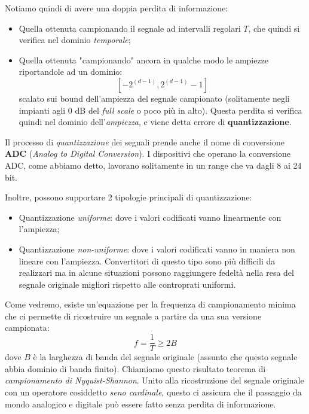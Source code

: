\documentclass[a4paper,11pt]{article}
\begin{document}
\begin{enumerate}
		Notiamo quindi di avere una doppia perdita di informazione:
		\begin{itemize}
			\item Quella ottenuta campionando il segnale ad intervalli regolari $T$, che quindi si verifica nel dominio \textit{temporale};
			\item Quella ottenuta "campionando" ancora in qualche modo le ampiezze riportandole ad un dominio:
				$$
					[-2^{(d - 1)}, 2^{(d - 1)} - 1]
				$$
				scalato sui bound dell'ampiezza del segnale campionato (solitamente negli impianti agli 0 dB del \textit{full scale} o poco più in alto). 
				Questa perdita si verifica quindi nel dominio dell'\textit{ampiezza}, e viene detta errore di \textbf{quantizzazione}.
		\end{itemize}

		Il processo di \textit{quantizzazione} dei segnali prende anche il nome di conversione \textbf{ADC} (\textit{Analog to Digital Conversion}). I dispositivi che operano la conversione ADC, come abbiamo detto, lavorano solitamente in un range che va dagli 8 ai 24 bit.
	
		\newpage

		Inoltre, possono supportare 2 tipologie principali di quantizzazione:
		\begin{itemize}
			\item Quantizzazione \textit{uniforme}: dove i valori codificati vanno linearmente con l'ampiezza; 
			\item Quantizzazione \textit{non-uniforme}: dove i valori codificati vanno in maniera non lineare con l'ampiezza. Convertitori di questo tipo sono più difficili da realizzari ma in alcune situazioni possono raggiungere fedeltà nella resa del segnale originale migliori rispetto alle controprati uniformi.
		\end{itemize}
\end{enumerate}

Come vedremo, esiste un'equazione per la frequenza di campionamento minima che ci permette di ricostruire un segnale a partire da una sua versione campionata:
$$
f = \frac{1}{T} \geq 2 B
$$
dove $B$ è la larghezza di banda del segnale originale (assunto che questo segnale abbia dominio di banda finito). Chiamiamo questo risultato teorema di \textit{campionamento di Nyquist-Shannon}. Unito alla ricostruzione del segnale originale con un operatore cosiddetto \textit{seno cardinale}, questo ci assicura che il passaggio da mondo analogico e digitale può essere fatto senza perdita di informazione. 
\end{document}
